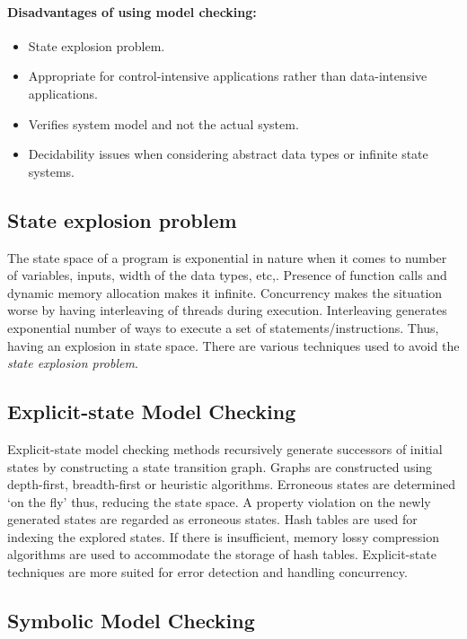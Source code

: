 \paragraph{Disadvantages of using model checking:}
\begin{itemize}
\item	State explosion problem.
\item	Appropriate for control-intensive applications rather than data-intensive applications. 
\item	Verifies system model and not the actual system. 
\item	Decidability issues when considering abstract data types or infinite state systems.
\end{itemize}

\subsection{State explosion problem \label{state_exp_prob}}

The state space of a program is exponential in nature when it comes to number of variables, inputs, width of the data types, etc,. 
Presence of function calls and dynamic memory allocation makes it infinite\cite{d2008survey}. 
Concurrency makes the situation worse by having interleaving of threads during execution. 
Interleaving generates exponential number of ways to execute a set of statements/instructions. 
Thus, having an explosion in state space. 
There are various techniques used to avoid the \emph{state explosion problem}. 
 
\subsection{Explicit-state Model Checking}

Explicit-state model checking methods recursively generate successors of initial states by constructing a state transition graph. 
Graphs are constructed using depth-first, breadth-first or heuristic algorithms. 
Erroneous states are determined `on the fly' thus, reducing the state space. 
A property violation on the newly generated states are regarded as erroneous states. 
Hash tables are used for indexing the explored states. 
If there is insufficient, memory lossy compression algorithms are used to accommodate the storage of hash tables\cite{d2008survey}. 
Explicit-state techniques are more suited for error detection and handling concurrency. 

\subsection{Symbolic Model Checking}

